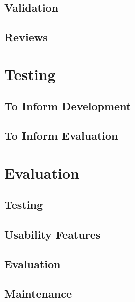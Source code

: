 ﻿\documentclass{article}
\begin{document}
    \subsection{Validation}
    \subsection{Reviews}
    
    
    \section{Testing}
    \subsection{To Inform Development}
    \subsection{To Inform Evaluation}
    
    
    \section{Evaluation}
    \subsection{Testing}
    \subsection{Usability Features}
    \subsection{Evaluation}
    \subsection{Maintenance}
\end{document}
